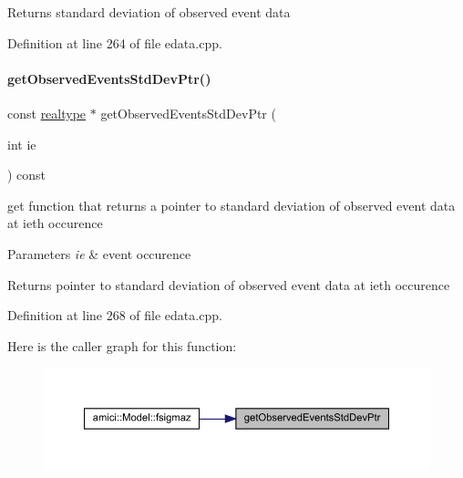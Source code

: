 \begin{DoxyReturn}{Returns}
standard deviation of observed event data 
\end{DoxyReturn}


Definition at line 264 of file edata.\+cpp.

\mbox{\label{classamici_1_1_exp_data_aabab4dfc080fdf961b6a3bbf1aebd631}} 
\paragraph{\texorpdfstring{getObservedEventsStdDevPtr()}{getObservedEventsStdDevPtr()}}
{\footnotesize\ttfamily const \mbox{\hyperlink{namespaceamici_a1bdce28051d6a53868f7ccbf5f2c14a3}{realtype}} $\ast$ get\+Observed\+Events\+Std\+Dev\+Ptr (\begin{DoxyParamCaption}\item[{int}]{ie }\end{DoxyParamCaption}) const}

get function that returns a pointer to standard deviation of observed event data at ieth occurence


\begin{DoxyParams}{Parameters}
{\em ie} & event occurence \\
\hline
\end{DoxyParams}
\begin{DoxyReturn}{Returns}
pointer to standard deviation of observed event data at ieth occurence 
\end{DoxyReturn}


Definition at line 268 of file edata.\+cpp.

Here is the caller graph for this function\+:
\nopagebreak
\begin{figure}[H]
\begin{center}
\leavevmode
\includegraphics[width=350pt]{classamici_1_1_exp_data_aabab4dfc080fdf961b6a3bbf1aebd631_icgraph}
\end{center}
\end{figure}
\mbox{\label{classamici_1_1_exp_data_a81a6a21cd5d905d5b6199f3a97030f61}} 
